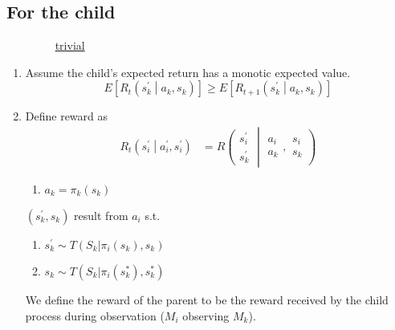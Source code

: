 \subsection{For the child}

\boxed{$\textasteriskcentered$}$\qquad\qquad$ \underline{trivial}

\begin{enumerate}[label=\arabic*.]
\item Assume the child's expected return has a monotic expected value.
\begin{equation*}
E\left[ R_t \left( s^\prime_k \middle| a_k, s_k \right) \right] \ge E\left[ R_{t+1}\left( s^\prime_k \middle| a_k, s_k  \right) \right]
\end{equation*}
\item{Define reward as}
\begin{align*}
R_t\left( s^\prime_i \middle| a^\prime_i, s^\prime_i \right) & = R\left( \begin{array}{c} s^\prime_i \\ s^\prime_k \end{array} \middle| 
\begin{array}{c}a_i \\ a_k \end{array}, \begin{array}{c} s_i \\ s_k \end{array} \right)
\end{align*}
\hspace*{6cm}
\begin{minipage}[t]{\linegoal}
\begin{enumerate}[label=$\qquad$\roman*.]
\item $a_k = \pi_k( s_k )$
\end{enumerate}
$( s^\prime_k, s_k )$ result from $a_i$ s.t.
\begin{enumerate}[label=$\qquad$\roman*.,start=2]
\item $s^\prime_k \sim T( S_k | \pi_i( s_k ), s_k )$
\item $s_k \sim T( S_k | \pi_i( s^\ast_k ), s^\ast_k )$
\end{enumerate}
\end{minipage}
We define the reward of the parent to be the reward received by the child process during observation ($M_i$ observing $M_k$).
\end{enumerate}
